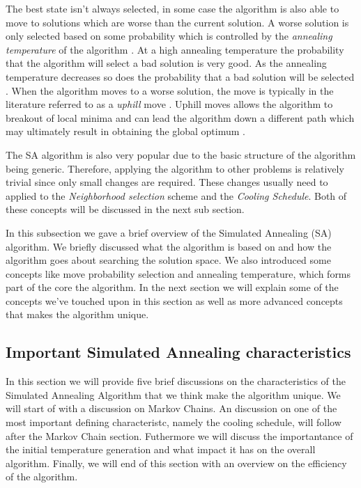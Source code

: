 The best state isn't always selected, in some case the algorithm is also able to move to solutions which are worse than the current solution. A worse solution is only selected based on some probability which is controlled by the \emph{annealing temperature} of the algorithm \cite{TheoPraticalSA}. At a high annealing temperature the probability that the algorithm will select a bad solution is very good. As the annealing temperature decreases so does the probability that a bad solution will be selected \cite{CurveFittingSA}. When the algorithm moves to a worse solution, the move is typically in the literature referred to as a \emph{uphill} move \cite{CurveFittingSA}. Uphill moves allows the algorithm to breakout of local minima and can lead the algorithm down a different path which may ultimately result in obtaining the global optimum \cite{SASingleMultiObj}. 

The SA algorithm is also very popular due to the basic structure of the algorithm being generic\cite{VariousCoolingSA}. Therefore, applying the algorithm to other problems is relatively trivial since only small changes are required. These changes usually need to applied to the \emph{Neighborhood selection} scheme and the \emph{Cooling Schedule}\cite{VariousCoolingSA,DormRoomSA}. Both of these concepts will be discussed in the next sub section.

In this subsection we gave a brief overview of the Simulated Annealing (SA) algorithm. We briefly discussed what the algorithm is based on and how the algorithm goes about searching the solution space. We also introduced some concepts like move probability selection and annealing temperature, which forms part of the core the algorithm. In the next section we will explain some of the concepts we've touched upon in this section as well as more advanced concepts that makes the algorithm unique.

\subsection{Important Simulated Annealing characteristics}
In this section we will provide five brief discussions on the characteristics of the Simulated Annealing Algorithm that we think make the algorithm unique. We will start of with a discussion on Markov Chains. An discussion on one of the most important defining characteristc, namely the cooling schedule, will follow after the Markov Chain section. Futhermore we will discuss the importantance of the initial temperature generation and what impact it has on the overall algorithm. Finally, we will end of this section with an overview on the efficiency of the algorithm.
